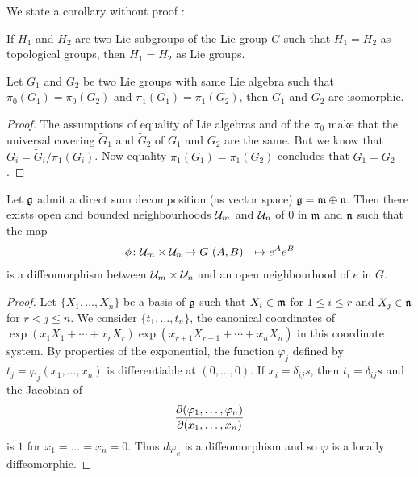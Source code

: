 We state a corollary without proof :

\begin{corollary} 
If $H_1$ and $H_2$ are two Lie subgroups of the Lie group $G$  such that $H_1=H_2$ as topological groups, then $H_1=H_2$ as Lie groups.
 \label{cor:top_subgroup}
\end{corollary}

\begin{proposition}
Let $G_1$ and $G_2$ be two Lie groups with same Lie algebra such that $\pi_0(G_1)=\pi_0(G_2)$ and $\pi_1(G_1)=\pi_1(G_2)$, then $G_1$ and $G_2$ are isomorphic.
\end{proposition}

\begin{proof}
The assumptions of equality of Lie algebras and of the $\pi_0$ make that the universal covering $\tilde G_1$ and $\tilde G_2$ of $G_1$ and $G_2$ are the same. But we know that $G_i=\tilde G_i/\pi_1(G_i)$. Now equality $\pi_1(G_1)=\pi_1(G_2)$ concludes that $G_1=G_2$.
\end{proof}

\begin{lemma}
Let $\mathfrak{g}$ admit a direct sum decomposition (as vector space) $\mathfrak{g}=\mathfrak{m}\oplus\mathfrak{n}$. Then there exists open and bounded neighbourhoods $\mathcal{U}_m$ and $\mathcal{U}_n$ of $0$ in $\mathfrak{m}$ and $\mathfrak{n}$ such that the map 
		\begin{equation}
		\begin{aligned}
			\phi \colon \mathcal{U}_m\times\mathcal{U}_n &\to G\
			(A,B)&\mapsto e^Ae^B
		\end{aligned}
	\end{equation}	
is a diffeomorphism between $\mathcal{U}_m\times\mathcal{U}_n$ and an open neighbourhood of $e$ in $G$.
 \label{lem:decomp}
\end{lemma}


\begin{proof}
Let $\{X_1,\ldots,X_n\}$ be a basis of $\mathfrak{g}$ such that $X_i\in\mathfrak{m}$ for $1\leq i\leq r$ and $X_j\in\mathfrak{n}$ for $r<j\leq n$. We consider $\{t_1,\ldots,t_n\}$, the canonical coordinates of $\exp(x_1X_1+\cdots+x_rX_r)\exp(x_{r+1}X_{r+1}+\cdots+x_nX_n)$ in this coordinate system. By properties of the exponential, the function $\varphi_j$ defined by $t_j=\varphi_j(x_1,\ldots,x_n)$ is differentiable at $(0,\ldots,0)$. If $x_i=\delta_{ij}s$, then $t_i=\delta_{ij}s$ and the Jacobian of 
\[
   \frac{\partial (\varphi_1,\ldots,\varphi_n)}{\partial (x_1,\ldots,x_n)}
\]
is $1$ for $x_1=\ldots=x_n=0$. Thus $d\varphi_e$ is a diffeomorphism and so $\varphi$ is a locally diffeomorphic.
\end{proof}

